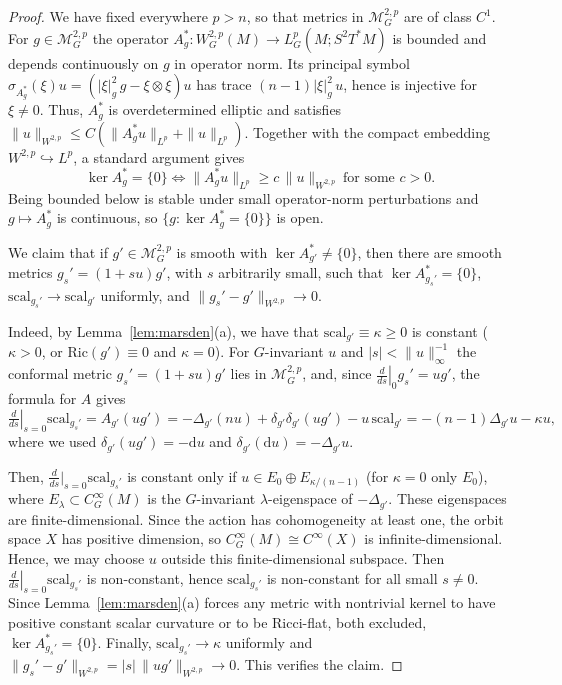 \documentclass[10pt,a4paper]{amsart}
\newcommand{\ga}{\mathit{g}} %
\begin{document}
\begin{proof}
We have fixed everywhere $p>n$, so that metrics in $\mathcal M_G^{2,p}$ are of class $C^1$. For $\ga\in\mathcal M_G^{2,p}$ the operator
$A_\ga^*\colon W_G^{2,p}(M)\to L_G^p(M;S^2T^*M)$ is bounded and depends continuously on $\ga$ in operator norm. Its principal symbol
$\sigma_{A_\ga^*}(\xi)u=(|\xi|_\ga^2\,\ga-\xi\otimes\xi)u$ has trace
$(n-1)|\xi|_\ga^2\,u$, hence is injective for $\xi\neq0$. Thus, $A_\ga^*$ is
overdetermined elliptic and satisfies
$\|u\|_{W^{2,p}}\le C(\|A_\ga^*u\|_{L^p}+\|u\|_{L^p})$. Together with the compact
embedding $W^{2,p}\hookrightarrow L^p$, a standard argument gives
\[
  \ker A_\ga^*=\{0\}\iff \|A_\ga^*u\|_{L^p}\ge c\,\|u\|_{W^{2,p}}\ \text{for some }c>0 .
\]
Being bounded below is stable under small operator-norm perturbations and
$\ga\mapsto A_\ga^*$ is continuous, so $\{\ga:\ker A_\ga^*=\{0\}\}$ is open.

We claim that if $\ga'\in\mathcal M_G^{2,p}$ is smooth with
$\ker A_{\ga'}^*\neq\{0\}$, then there are smooth metrics $\ga_s'=(1+su)\ga'$, with $s$ arbitrarily small, such that $\ker A_{\ga_s'}^*=\{0\}$,
$\mathrm{scal}_{\ga_s'}\to\mathrm{scal}_{\ga'}$ uniformly, and
$\|\ga_s'-\ga'\|_{W^{2,p}}\to0$.

Indeed, by Lemma~\ref{lem:marsden}(a), we have that $\mathrm{scal}_{\ga'}\equiv\kappa\ge0$ is constant
($\kappa>0$, or $\mathrm{Ric}(\ga')\equiv0$ and $\kappa=0$). For $G$-invariant
$u$ and $|s|<\|u\|_\infty^{-1}$ the conformal metric $\ga_s'=(1+su)\ga'$ lies in $\mathcal M_G^{2,p}$, and, since $\left.\tfrac{d}{ds}\right|_{0}\ga_s'=u\ga'$,
the formula for $A$ gives
\[
  \left.\tfrac{d}{ds}\right|_{s=0}\mathrm{scal}_{\ga_s'}
  =A_{\ga'}(u\ga')=-\Delta_{\ga'}(n u)+\delta_{\ga'}\delta_{\ga'}(u\ga')-u\,\mathrm{scal}_{\ga'}
  =-(n-1)\Delta_{\ga'}u-\kappa u ,
\]
where we used $\delta_{\ga'}(u\ga')=-\mathrm{d} u$ and $\delta_{\ga'}(\mathrm{d} u)=-\Delta_{\ga'}u$.

Then, $\tfrac{d}{ds}|_{s=0}\mathrm{scal}_{\ga_s'}$ is constant only if $u\in E_0\oplus E_{\kappa/(n-1)}$  (for $\kappa=0$ only $E_0$), where
$E_\lambda\subset C_G^\infty(M)$ is the $G$-invariant $\lambda$-eigenspace of
$-\Delta_{\ga'}$. These eigenspaces are finite-dimensional. Since the action has cohomogeneity at least one,
the orbit space $X$ has positive dimension, so $C^\infty_G(M)\cong C^\infty(X)$ is
infinite-dimensional. Hence, we may choose $u$ outside this finite-dimensional subspace. Then $\left.\tfrac{d}{ds}\right|_{s=0}\mathrm{scal}_{\ga_s'}$ is
non-constant, hence $\mathrm{scal}_{\ga_s'}$ is non-constant for all small
$s\neq0$. Since Lemma~\ref{lem:marsden}(a) forces any metric with nontrivial kernel to have positive constant scalar curvature or to be Ricci-flat, both excluded, $\ker A_{\ga_s'}^*=\{0\}$. Finally, $\mathrm{scal}_{\ga_s'}\to\kappa$ uniformly and
$\|\ga_s'-\ga'\|_{W^{2,p}}=|s|\,\|u\ga'\|_{W^{2,p}}\to0$. This verifies the claim.



\end{proof}
\end{document}
